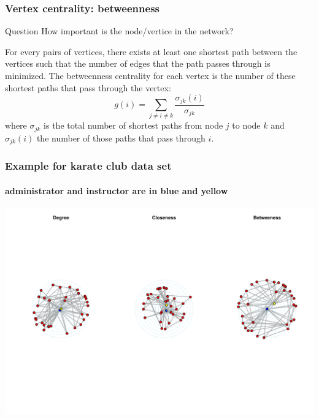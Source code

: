 \documentclass{beamer}\usepackage[]{graphicx}\usepackage[]{color}
\newenvironment{knitrout}{}{} %
\begin{document}
\begin{frame}
  \frametitle{Vertex centrality: betweenness}

  \begin{block}{Question}
    How important is the node/vertice in the network?
  \end{block}

  \begin{definition}[Betweenness]
    For every pairs of vertices, there exists at least one shortest path between the vertices such that the number of edges that the path passes through is minimized.
    The betweenness centrality for each vertex is the number of these shortest paths that pass through the vertex: 
    \[
        g(i)=\sum _{{j\neq i\neq k}}{\frac  {\sigma _{{jk}}(i)}{\sigma _{{jk}}}}    
    \]
    where $\sigma _{jk}$ is the total number of shortest paths from node $j$ to node $k$ and $\sigma _{jk}(i)$ the number of those paths that pass through $i$.

  \end{definition}

\end{frame}

\begin{frame}[fragile]
  \frametitle{Example for karate club data set}
  \framesubtitle{administrator and instructor are in blue and yellow}

\begin{knitrout}\scriptsize
{}\color{fgcolor}
\includegraphics[width=\textwidth]{figures/density-1} 

\end{knitrout}

\end{frame}
\end{document}
